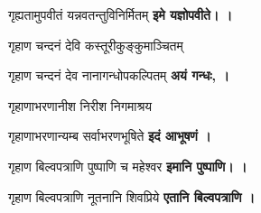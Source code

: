 \begin{center}
{गृह्यतामुपवीतं यन्नवतन्तुविनिर्मितम्}
\textbf{इमे यज्ञोपवीते। \devAya{}।}
\medskip

{गृहाण चन्दनं देवि कस्तूरीकुङ्कुमाञ्चितम्}

{गृहाण चन्दनं देव नानागन्धोपकल्पितम्}
\textbf{अयं गन्धः, \devAya{}।}
\medskip

{गृहाणाभरणानीश निरीश निगमाश्रय}

{गृहाणाभरणान्यम्ब सर्वाभरणभूषिते}
\textbf{इदं आभूषणं \devAya{}।}
\medskip

{गृहाण बिल्वपत्राणि पुष्पाणि च महेश्वर}
\textbf{इमानि पुष्पाणि। \devAya{}।}
\medskip

{गृहाण बिल्वपत्राणि नूतनानि शिवप्रिये}
\textbf{एतानि बिल्वपत्राणि \devAya{}।}
\medskip

\end{center}
\begingroup
\centering
\setlength{\columnseprule}{1pt}
\let\chapt\sect

\endgroup


